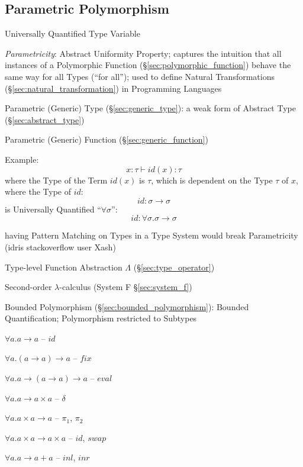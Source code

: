 \subsection{Parametric Polymorphism}\label{sec:parametric_polymorphism}

Universally Quantified Type Variable

\emph{Parametricity}: Abstract Uniformity Property; captures the
intuition that all instances of a Polymorphic Function
(\S\ref{sec:polymorphic_function}) behave the same way for all Types
(``for all''); used to define Natural Transformations
(\S\ref{sec:natural_transformation}) in Programming Languages

Parametric (Generic) Type (\S\ref{sec:generic_type}): a weak form of
Abstract Type (\S\ref{sec:abstract_type})

Parametric (Generic) Function (\S\ref{sec:generic_function})

Example:
\[
  x:\tau \vdash id(x):\tau
\]
where the Type of the Term $id(x)$ is $\tau$, which is dependent on
the Type $\tau$ of $x$, where the Type of $id$:
\[
  id:\sigma \rightarrow \sigma
\]
is Universally Quantified ``$\forall \sigma$'':
\[
  id:\forall \sigma.\sigma \rightarrow \sigma
\]


having Pattern Matching on Types in a Type System would break
Parametricity (idris stackoverflow user Xash) %

Type-level Function Abstraction $\Lambda$ (\S\ref{sec:type_operator})

Second-order $\lambda$-calculus (System F \S\ref{sec:system_f})

Bounded Polymorphism (\S\ref{sec:bounded_polymorphism}): Bounded
Quantification; Polymorphism restricted to Subtypes


\asterism


$\forall a.a \rightarrow a$ -- $id$

$\forall a.(a \rightarrow a) \rightarrow a$ -- $fix$

$\forall a.a \rightarrow (a \rightarrow a) \rightarrow a$ -- $eval$


$\forall a.a \rightarrow a \times a$ -- $\delta$

$\forall a.a \times a \rightarrow a$ -- $\pi_1$, $\pi_2$

$\forall a.a \times a \rightarrow a \times a$ -- $id$, $swap$


$\forall a.a \rightarrow a + a$ -- $inl$, $inr$

